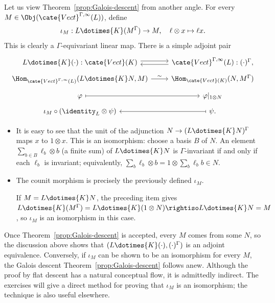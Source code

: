 Let us view Theorem~\ref{prop:Galois-descent} from another angle. For every
$M\in\Obj(\cate{Vect}^{\Gamma,\infty}(L))$, define
\begin{equation}\label{eqn:Galois-descent-iotaM}
	\iota_M: L \dotimes{K} (M^{\Gamma}) \to M, \quad
	\ell \otimes x \mapsto \ell x .
\end{equation}
This is clearly a $\Gamma$-equivariant linear map. There is a simple adjoint
pair
\begin{equation}\label{eqn:Galois-descent-adjunction}
	\begin{tikzcd}[row sep=tiny]
		L \dotimes{K} (\cdot) : \cate{Vect}(K) \arrow[shift left, r] & \cate{Vect}^{\Gamma, \infty}(L) : (\cdot)^{\Gamma}, \arrow[shift left, l] \\
		\Hom_{\cate{Vect}^{\Gamma, \infty}(L)} (L \dotimes{K} N, M) \arrow[r, "\sim"] & \Hom_{\cate{Vect}(K)}(N, M^{\Gamma}) \\
		\varphi \arrow[mapsto, r] & \varphi|_{1 \otimes N} \\
		\iota_M \circ (\identity_L \otimes \psi) & \psi. \arrow[mapsto, l]
	\end{tikzcd}
\end{equation}
\begin{itemize}
	\item It is easy to see that the unit of the adjunction
	$N\to(L\dotimes{K}N)^\Gamma$ maps $x$ to $1\otimes x$. This is an
	isomorphism: choose a basis $B$ of $N$. An element
	$\sum_{b\in B}\ell_b\otimes b$ (a finite sum) of $L\dotimes{K}N$ is
	$\Gamma$-invariant if and only if each $\ell_b$ is invariant; equivalently,
	$\sum_b\ell_b\otimes b=1\otimes\sum_b\ell_b b\in N$.
	\item The counit morphism is precisely the previously defined $\iota_M$.

	If $M=L\dotimes{K}N$, the preceding item gives
	$L\dotimes{K}(M^\Gamma)=L\dotimes{K}(1\otimes N)\rightiso
	L\dotimes{K}N=M$, so $\iota_M$ is an isomorphism in this case.
\end{itemize}

Once Theorem~\ref{prop:Galois-descent} is accepted, every $M$ comes from some
$N$, so the discussion above shows that
$(L\dotimes{K}(\mathord\cdot),(\mathord\cdot)^\Gamma)$ is an adjoint
equivalence. Conversely, if $\iota_M$ can be shown to be an isomorphism for
every $M$, the Galois descent Theorem~\ref{prop:Galois-descent} follows anew.
Although the proof by flat descent has a natural conceptual flow, it is
admittedly indirect. The exercises will give a direct method for proving that
$\iota_M$ is an isomorphism; the technique is also useful elsewhere.

